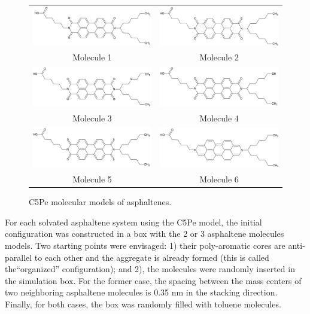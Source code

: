 \begin{figure}[htb]
	\centering
	\begin{tabular}{cc}
		\includegraphics[width=0.45\columnwidth]{image/1} &
		\includegraphics[width=0.45\columnwidth]{image/2}\\
		Molecule 1 & Molecule 2\\
		\includegraphics[width=0.45\columnwidth]{image/3} &
		\includegraphics[width=0.45\columnwidth]{image/4}\\
		Molecule 3 & Molecule 4\\
		\includegraphics[width=0.45\columnwidth]{image/5} &
		\includegraphics[width=0.45\columnwidth]{image/6}\\
		Molecule 5 & Molecule 6\\        
	\end{tabular}
	\caption{C5Pe molecular models of asphaltenes. }
	\label{pap:fig01}
\end{figure}

For each solvated asphaltene system using the C5Pe model, the initial configuration was constructed in a box with the 2 or 3 asphaltene molecules models. Two starting points were envisaged: 1) their poly-aromatic cores are anti-parallel to each other and the aggregate is already formed (this is called the``organized'' configuration); and 2), the molecules were randomly inserted in the simulation box. For the former case, the spacing between the mass centers of two neighboring asphaltene molecules is 0.35 nm in the stacking direction. Finally, for both cases, the box was randomly filled with toluene molecules.\\

